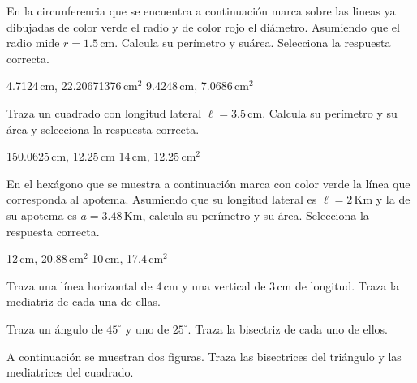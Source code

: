 \documentclass[11pt]{article}
\begin{document}
\vspace{5cm}
En la circunferencia que se encuentra a continuaci\'on marca sobre las lineas ya
dibujadas de color verde el radio y de color rojo el di\'ametro. Asumiendo que
el radio mide $r=1.5$\,cm. Calcula su per\'imetro y su\'area. Selecciona la
respuesta correcta.

\hfill {} 4.7124\,cm, 22.20671376\,cm$^{2}$ \qquad 
{} 9.4248\,cm, 7.0686\,cm$^{2}$



\vspace{1.5cm}
Traza un cuadrado con longitud lateral $\ell=3.5$\,cm. Calcula su per\'imetro y
su \'area y selecciona la respuesta correcta.

\hfill {} 150.0625\,cm, 12.25\,cm \qquad {} 14\,cm, 12.25\,cm$^{2}$

\newpage
En el hex\'agono que se muestra a continuaci\'on marca con color verde la
l\'inea que corresponda al apotema. Asumiendo que su longitud lateral es
$\ell=2$\,Km y la de su apotema es $a=3.48$\,Km, calcula su per\'imetro y su
\'area. Selecciona la respuesta correcta.

\hfill {} 12\,cm, 20.88\,cm$^{2}$ \qquad {} 10\,cm, 17.4\,cm$^{2}$


\vspace{3mm}
Traza una l\'inea horizontal de 4\,cm y una vertical de 3\,cm de longitud. Traza
la mediatriz de cada una de ellas.

\vspace{4cm}
Traza un \'angulo de $45^{\circ}$ y uno de $25^{\circ}$. Traza la bisectriz de
cada uno de ellos.

\vspace{4cm}
A continuaci\'on se muestran dos figuras. Traza las bisectrices del tri\'angulo
y las mediatrices del cuadrado.

\vspace{3mm}
\begin{center}
\end{center}
\vspace{3mm}
\end{document}
